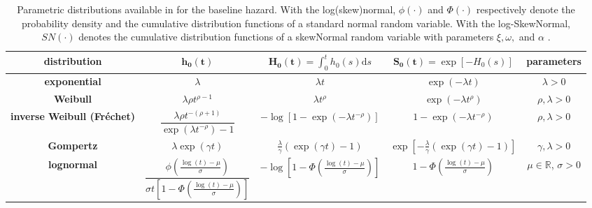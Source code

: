 \begin{sidewaystable}[] \centering \doublespacing
\caption{Parametric distributions available in  for the baseline hazard.
    With the log(skew)normal, $\phi(\cdot)$ and $\Phi(\cdot)$ 
        respectively denote the probability density and the cumulative distribution functions
        of a standard normal random variable.
    With the log-SkewNormal, $SN(\cdot)$
        denotes the cumulative distribution functions
        of a skewNormal random variable with parameters $\xi, \omega,$ and $\alpha$
        \citep{Azzalini85}.}
\label{tab:model.baselines}	
\renewcommand{\arraystretch}{1.5}
  \begin{tabular}{ccccc}
  \hline \hline
  {\bf distribution}
    & $\bm{h_{0}(t)}$
    & $\bm{H_{0}(t)} = \int_{0}^{t} h_{0} ( s ) \textrm{d} s$
    & $\bm{S_{0}(t)} = \exp[-H_{0} ( s )]$
    & {\bf parameters}
  \\ %
  \hline
  {\bf exponential}
    & $\lambda$
    & $\lambda t$
    & $\exp(-\lambda t)$
    & $\lambda > 0$
  \\ %
  {\bf Weibull}
    & $\lambda \rho t^{\rho - 1}$
    & $\lambda t^{\rho}$
    & $\exp(-\lambda t^{\rho})$
    & $\rho, \lambda > 0$
  \\ %
  {\bf inverse Weibull (Fr\'echet)}
    & $\dfrac{\lambda \rho t^{-(\rho + 1)}}{\exp(\lambda t^{-\rho}) - 1}$
    & $-\log\left[1 - \exp(-\lambda t^{-\rho})\right]$
    & $1 - \exp(-\lambda t^{-\rho})$
    & $\rho, \lambda > 0$
  \\ %
  {\bf Gompertz}
    & $\lambda \exp ( \gamma t )$
    & $\frac{\lambda}{\gamma} \left(\exp (\gamma t) - 1\right)$
    & $\exp\left[-\frac{\lambda}{\gamma} \left(\exp (\gamma t) - 1\right)\right]$
    & $\gamma, \lambda > 0$
  \\ %
  {\bf lognormal}
    & $\dfrac{\phi \left(\frac{\log(t) - \mu}{\sigma} \right)}
	      		   {\sigma t \left[1 - \Phi\left(\frac{\log(t) - \mu}{\sigma} \right) \right]}$
    & $- \log \left[1 - \Phi\left(\frac{\log(t) - \mu}{\sigma} \right)\right]$
    & $1 - \Phi\left(\frac{\log(t) - \mu}{\sigma} \right)$
    & $\mu \in \mathbb{R}$, $\sigma > 0$
  \\[2em] %

\end{tabular}
\end{sidewaystable}
